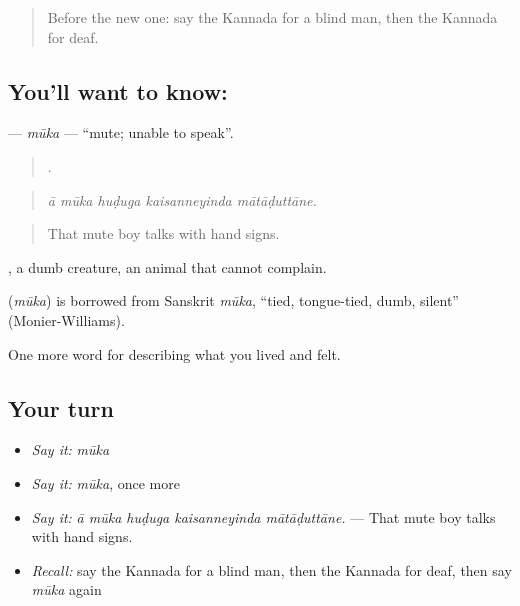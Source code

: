 \label{lesson:KA-C515-muka}



\begin{quote}
Before the new one: say the Kannada for a blind man, then the Kannada for deaf.
\end{quote}

\subsection*{You'll want to know: }
\textbf{} — \emph{mūka} — \textquotedblleft{}mute; unable to speak\textquotedblright{}.

\begin{quote}
    .
\end{quote}

\begin{quote}
\emph{ā mūka huḍuga kaisanneyinda mātāḍuttāne.}
\end{quote}

\begin{quote}
That mute boy talks with hand signs.
\end{quote}

 , a dumb creature, an animal that cannot complain.

\begin{cousinweb}
\textbf{} (\emph{mūka}) is borrowed from Sanskrit \emph{mūka}, \textquotedblleft{}tied, tongue-tied, dumb, silent\textquotedblright{} (Monier-Williams).
\end{cousinweb}

\begin{grammarlens}[title={What you've built}]
One more word for describing what you lived and felt.
\end{grammarlens}

\subsection*{Your turn}
\begin{itemize}
\raggedright
  \item \emph{Say it:} \emph{mūka}
  \item \emph{Say it:} \emph{mūka}, once more
  \item \emph{Say it:} \emph{ā mūka huḍuga kaisanneyinda mātāḍuttāne.} — That mute boy talks with hand signs.
  \item \emph{Recall:} say the Kannada for a blind man, then the Kannada for deaf, then say \emph{mūka} again
\end{itemize}

